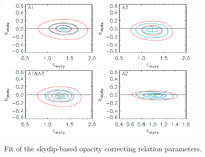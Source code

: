\begin{figure}[ht!]
  \begin{center}
    \includegraphics[clip=true, trim={0, -0.3cm, -0.3cm, 0}, width=0.42\textwidth]{Figures/Opacity/fit_nika2_tau_from_skydip_mwc349_a1.pdf}
    \includegraphics[clip=true, trim={0, -0.3cm, -0.3cm, 0}, width=0.42\textwidth]{Figures/Opacity/fit_nika2_tau_from_skydip_mwc349_a3.pdf}
    \includegraphics[clip=true, trim={0, -0.3cm, -0.3cm, 0}, width=0.42\textwidth]{Figures/Opacity/fit_nika2_tau_from_skydip_mwc349_1mm.pdf}
    \includegraphics[clip=true, trim={0, -0.3cm, -0.3cm, 0}, width=0.42\textwidth]{Figures/Opacity/fit_nika2_tau_from_skydip_mwc349_a2.pdf}
    \caption[NIKA2 skydip-based opacity correcting
    relation]{Fit of the skydip-based opacity correcting relation
    parameters.
}
\end{center}
\end{figure}
